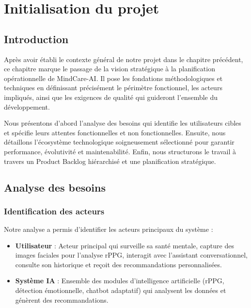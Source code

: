 \chapter{Initialisation du projet}
\begingroup
{}
\localtableofcontents
\endgroup
\newpage

\section{Introduction}
Après avoir établi le contexte général de notre projet dans le chapitre précédent, ce chapitre marque le passage de la vision stratégique à la planification opérationnelle de MindCare-AI. Il pose les fondations méthodologiques et techniques en définissant précisément le périmètre fonctionnel, les acteurs impliqués, ainsi que les exigences de qualité qui guideront l'ensemble du développement.

Nous présentons d'abord l'analyse des besoins qui identifie les utilisateurs cibles et spécifie leurs attentes fonctionnelles et non fonctionnelles. Ensuite, nous détaillons l'écosystème technologique soigneusement sélectionné pour garantir performance, évolutivité et maintenabilité. Enfin, nous structurons le travail à travers un Product Backlog hiérarchisé et une planification stratégique.

\section{Analyse des besoins}

\subsection{Identification des acteurs}
Notre analyse a permis d'identifier les acteurs principaux du système :
\begin{itemize}
    \item \textbf{Utilisateur} : Acteur principal qui surveille sa santé mentale, capture des images faciales pour l'analyse rPPG, interagit avec l'assistant conversationnel, consulte son historique et reçoit des recommandations personnalisées.
    \item \textbf{Système IA} : Ensemble des modules d'intelligence artificielle (rPPG, détection émotionnelle, chatbot adaptatif) qui analysent les données et génèrent des recommandations.
\end{itemize}


